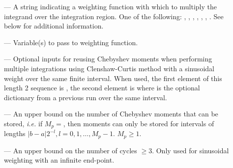 \begin{description}
\item[] --- A string indicating a weighting function
with which to multiply the integrand over the integration region. One
of the following: , , ,
, , ,
.  See below for additional information.
\item[] --- Variable(s) to pass to weighting function.
\item[] --- Optional inputs for reusing Chebyshev
moments when performing multiple integrations using Clenshaw-Curtis
method with a sinusoidal weight over the same finite interval.  When
used, the first element of this length 2 sequence is ,
the second element is  where  is the
optional dictionary from a previous run over the same interval.
\item[] --- An upper bound on the number of Chebyshev
moments that can be stored, {\em i.e.} if $M_p=$,
then moments can only be stored for intervals of lengths $|b-a|
2^{-l}, l=0,1,\ldots, M_p-1$.  $M_p \geq 1$.
\item[] --- An upper bound on the number of cycles
$\geq 3$.  Only used for sinusoidal weighting with an infinite end-point. 
\end{description}

